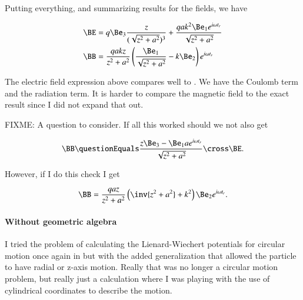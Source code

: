 {Putting everything, and summarizing results for the fields, we have

\begin{equation}\label{eqn:relativisticElectrodynamicsExamReflection:250}
\begin{aligned}
\BE &=
q \Be_3 \frac{z}{(\sqrt{z^2 + a^2})^3}
+
\frac{q a k^2 \Be_1 e^{i \omega t_r} }{\sqrt{z^2 + a^2}} \\
\BB
&= \frac{q a k z}{ z^2 + a^2} \left( \frac{\Be_1}{\sqrt{z^2 + a^2}} - k \Be_2 \right) e^{i \omega t_r}
\end{aligned}
\end{equation}

The electric field expression above compares well to .  We have the Coulomb term and the radiation term.  It is harder to compare the magnetic field to the exact result  since I did not expand that out.

FIXME: A question to consider.  If all this worked should we not also get

\begin{equation}\label{eqn:relativisticElectrodynamicsExamReflection:270}
\BB
\questionEquals
\frac{z \Be_3 - \Be_1 a e^{i \omega t_r}}{\sqrt{z^2 + a^2}} \cross \BE.
\end{equation}

However, if I do this check I get

\begin{equation}\label{eqn:relativisticElectrodynamicsExamReflection:290}
\BB
=
\frac{q a z}{z^2 + a^2} \left( \inv{z^2 + a^2} + k^2 \right) \Be_2 e^{i \omega t_r}.
\end{equation}


\paragraph{Without geometric algebra}

I tried the problem of calculating the Lienard-Wiechert potentials for circular motion once again in \citep{gabookII:matrixVectorPotentials} but with the added generalization that allowed the particle to have radial or z-axis motion.  Really that was no longer a circular motion problem, but really just a calculation where I was playing with the use of cylindrical coordinates to describe the motion.

}
